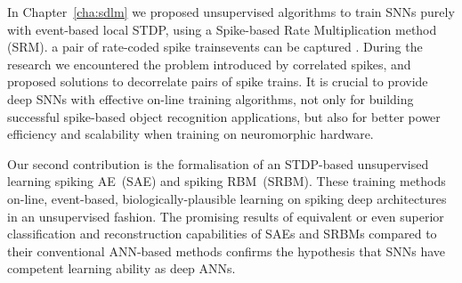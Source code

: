 In Chapter~\ref{cha:sdlm} we proposed unsupervised \DIFdelbegin {}\DIFdelend \DIFaddbegin {}\DIFaddend algorithms to train SNNs purely with event-based local STDP, using a Spike-based Rate Multiplication method \DIFdelbegin \DIFdel{~}\DIFdelend (SRM).
\DIFdelbegin {}\DIFdelend \DIFaddbegin {}\DIFaddend a pair of rate-coded spike trains\DIFdelbegin {}\DIFdelend \DIFaddbegin {}\DIFaddend events can be captured \DIFdelbegin {}\DIFdelend \DIFaddbegin {}\DIFaddend .
During the research we encountered the problem introduced by correlated spikes, and proposed solutions to decorrelate pairs of spike trains.
It is crucial to provide deep SNNs with effective on-line training algorithms, not only for building successful spike-based object recognition applications, but also for better power efficiency and scalability when training on neuromorphic hardware.

Our second contribution is the formalisation of an STDP-based unsupervised learning \DIFdelbegin {}\DIFdelend \DIFaddbegin {}\DIFaddend spiking AE~(SAE) and spiking RBM~(SRBM).
These training methods \DIFdelbegin {}\DIFdelend \DIFaddbegin {}\DIFaddend on-line, event-based, biologically-plausible learning on spiking deep architectures in an unsupervised fashion.
The promising results of equivalent or even superior classification and reconstruction capabilities of SAEs and SRBMs compared to their conventional ANN-based methods confirms the hypothesis that SNNs have competent learning ability as deep ANNs.

\DIFaddbegin 

